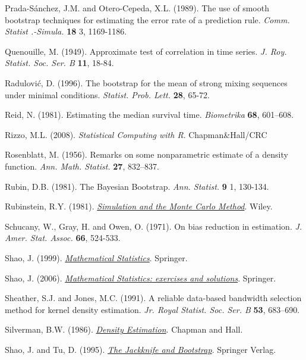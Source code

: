 \documentclass[]{book}
\theoremstyle{definition}
\theoremstyle{definition}
\theoremstyle{definition}
\theoremstyle{remark}
\begin{document}
Prada-Sánchez, J.M. and Otero-Cepeda, X.L. (1989). The use of smooth
bootstrap techniques for estimating the error rate of a prediction rule.
\emph{Comm. Statist .-Simula.} \textbf{18} 3, 1169-1186.

Quenouille, M. (1949). Approximate test of correlation in time series.
\emph{J. Roy. Statist. Soc. Ser. B} \textbf{11}, 18-84.

Radulović, D. (1996). The bootstrap for the mean of strong mixing
sequences under minimal conditions. \emph{Statist. Prob. Lett.}
\textbf{28}, 65-72.

Reid, N. (1981). Estimating the median survival time. \emph{Biometrika}
\textbf{68}, 601--608.

Rizzo, M.L. (2008). \emph{Statistical Computing with R}.
Chapman\&Hall/CRC

Rosenblatt, M. (1956). Remarks on some nonparametric estimate of a
density function. \emph{Ann. Math. Statist.} \textbf{27}, 832--837.

Rubin, D.B. (1981). The Bayesian Bootstrap. \emph{Ann. Statist.}
\textbf{9} 1, 130-134.

Rubinstein, R.Y. (1981).
\href{https://books.google.es/books?hl=es\&lr=\&id=r2VODQAAQBAJ\&oi=fnd\&pg=PR1\&dq=Simulation+and+the+Monte+Carlo+Method}{\emph{Simulation
and the Monte Carlo Method}}. Wiley.

Schucany, W., Gray, H. and Owen, O. (1971). On bias reduction in
estimation. \emph{J. Amer. Stat. Assoc.} \textbf{66}, 524-533.

Shao, J. (1999).
\href{https://www.springer.com/gp/book/9780387953823}{\emph{Mathematical
Statistics}}. Springer.

Shao, J. (2006).
\href{http://www.stewartschultz.com/statistics/books/Mathematical\%20Statistics\%20-\%20Exercises\%20and\%20Solutions.pdf}{\emph{Mathematical
Statistics: exercises and solutions}}. Springer.

Sheather, S.J. and Jones, M.C. (1991). A reliable data-based bandwidth
selection method for kernel density estimation. \emph{Jr. Royal Statist.
Soc. Ser. B} \textbf{53}, 683--690.

Silverman, B.W. (1986).
\href{http://users.stat.ufl.edu/~rrandles/sta6934/smhandout.pdf}{\emph{Density
Estimation}}. Chapman and Hall.

Shao, J. and Tu, D. (1995).
\href{https://books.google.es/books?hl=es\&lr=\&id=VO3SBwAAQBAJ\&oi=fnd\&pg=PA1\&dq=The+Jackknife+and+Bootstrap}{\emph{The
Jackknife and Bootstrap}}. Springer Verlag.
\end{document}
